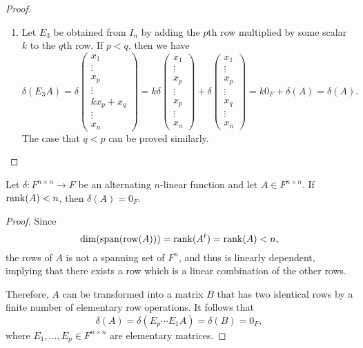 \begin{proof}
\begin{enumerate}
    \item Let $E_3$ be obtained from $I_n$ by adding the $p$th row multiplied
    by some scalar $k$ to the $q$th row.
    If $p < q$, then we have
    \begin{equation*}
      \delta(E_3A)
      =
      \delta
      \begin{pmatrix}
        x_1 \\ \vdots \\ x_p \\ \vdots \\ kx_p + x_q \\ \vdots \\ x_n
      \end{pmatrix}
      =
      k\delta
      \begin{pmatrix}
        x_1 \\ \vdots \\ x_p \\ \vdots \\ x_p \\ \vdots \\ x_n
      \end{pmatrix}
      +
      \delta
      \begin{pmatrix}
        x_1 \\ \vdots \\ x_p \\ \vdots \\ x_q \\ \vdots \\ x_n
      \end{pmatrix}
      = k0_F + \delta(A)
      = \delta(A).
    \end{equation*}
    The case that $q < p$ can be proved similarly.
    \qedhere
  \end{enumerate}
\end{proof}

\begin{theorem}
  \label{thm:zero-determinant}
  Let $\delta: F^{n \times n} \to F$ be an alternating $n$-linear function
  and let $A \in F^{n \times n}$.
  If $\operatorname{rank}(A) < n$, then $\delta(A) = 0_F$.
\end{theorem}
\begin{proof}
  Since
  \begin{equation*}
    \dim(\operatorname{span}(\operatorname{row}(A))) = \operatorname{rank}(A^t) = \operatorname{rank}(A) < n,
  \end{equation*}
  the rows of $A$ is not a spanning set of $F^n$, and thus is linearly
  dependent, implying that there exists a row which is a linear combination of
  the other rows.

  Therefore, $A$ can be transformed into a matrix $B$ that has two identical
  rows by a finite number of elementary row operations.
  It follows that
  \begin{equation*}
    \delta(A) = \delta(E_p \cdots E_1A) = \delta(B) = 0_F,
  \end{equation*}
  where $E_1, \dots, E_p \in F^{n \times n}$ are elementary matrices.
\end{proof}

